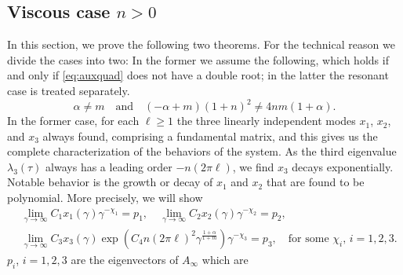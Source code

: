 \documentclass[a4paper,11pt]{article}
\def\l{(2\pi \ell)}
\theoremstyle{remark}
\begin{document}
\subsection{Viscous case $n>0$}
In this section, we prove the following two theorems. For the technical reason we divide the cases into two: In the former we assume the following, which holds if and only if \eqref{eq:auxquad} does not have a double root; in the latter the resonant case is treated separately.
 \begin{equation}
  \alpha\ne m \quad \text{and} \quad (-\alpha+m)(1+n)^2 \ne 4nm(1+\alpha). \tag{$A0$} \label{eq:nodoubleroot}
\end{equation}
In the former case, for each $\ell\ge 1$ the three linearly independent modes $x_1$, $x_2$, and $x_3$ always found, comprising a fundamental matrix, and this gives us the complete characterization of the behaviors of the system. As the third eigenvalue $\lambda_3(\tau)$ always  has a leading order $-n\l$, we find $x_3$ decays exponentially. Notable behavior is the growth or decay of $x_1$ and $x_2$ that are found to be polynomial.  More precisely, we will show
\begin{equation}
\begin{aligned}
 &\lim_{\gamma \rightarrow \infty} C_1 x_1(\gamma) \gamma^{-\chi_1} = p_1, \quad \lim_{\gamma \rightarrow \infty} C_2x_2(\gamma)  \gamma^{-\chi_2} = p_2, \\
 &\lim_{\gamma \rightarrow \infty} C_3 x_3(\gamma) \exp\left(C_4n\l^2 \gamma^{\frac{1+\alpha}{1+m}}\right)\gamma^{-\chi_3} = p_3, \quad \text{for some $\chi_i$, $i=1,2,3$}.
 \end{aligned}
\end{equation}
$p_i$, $i=1,2,3$ are the eigenvectors of $A_\infty$ which are
\end{document}
